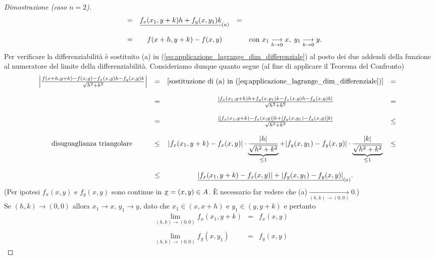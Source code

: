 \begin{proof}[Dimostrazione (caso $n=2$)]
\begin{equation}
\begin{matrix}
			&=& \uline{f_x(x_1,y+k) h + f_y(x,y_1) k}_{(a)} &=&\\\\
			&=& f(x+h,y+k)-f(x,y) && \text{con }x_1\underset{h\rightarrow 0}{\longrightarrow}x,\; y_1\underset{k\rightarrow 0}{\longrightarrow}y.
		\end{matrix}
	\end{equation}
	Per verificare la differenziabilità è sostituito (a) in (\ref{eq:applicazione_lagrange_dim_differenziale}) al posto dei due addendi della funzione al numeratore del limite della differenziabilità.
	Consideriamo dunque quanto segue (al fine di applicare il Teorema del Confronto)
	\begin{equation*}%
		\begin{matrix}
			\left|\frac{f(x+h,y+k) - f(x,y) - f_x(x,y)h - f_y(x,y)k}{\sqrt{h^2+k^2}}\right| &=& [\text{sostituzione di (a) in } (\ref{eq:applicazione_lagrange_dim_differenziale})] &=&\\\\
			&=& \frac{|f_x(x_1,y+k) h + f_y(x,y_1) k - f_x(x,y)h - f_y(x,y)k|}{\sqrt{h^2+k^2}} &=& \\\\
			&=& \frac{|[f_x(x_1,y+k)-f_x(x,y)]h + [f_y(x,y_1) - f_y(x,y)]k|}{\sqrt{h^2+k^2}} &\leq&\\\\
			\text{disuguaglianza triangolare }&\leq& |f_x(x_1,y+k)-f_x(x,y)| \cdot \underbrace{\frac{|h|}{\sqrt{h^2+k^2}}}_{\leq 1} + |f_y(x,y_1) - f_y(x,y)| \cdot \underbrace{\frac{|k|}{\sqrt{h^2 + k^2}}}_{\leq 1} &\leq&\\\\
			&\leq& \uline{|f_x(x_1,y+k)-f_x(x,y)|  + |f_y(x,y_1) - f_y(x,y)|}_{(a)}.
		\end{matrix}
	\end{equation*}
	(Per ipotesi $f_x(x,y)$ e $f_y(x,y)$ sono continue in $\uline x=(x,y)\in A$. È necessario far vedere che (a)$\underset{(h,k)\rightarrow(0,0)}{\longrightarrow}0$.)\\
	Se $(h,k)\rightarrow(0,0)$ allora $x_1\rightarrow x,\, y_1\rightarrow y$, dato che $x_1\in(x,x+h)$ e $y_1\in(y, y+k)$ e pertanto
	\begin{equation*}
		\begin{matrix}
			\lim\limits_{(h,k)\rightarrow(0,0)}f_x(x_1, y+k) &=& f_x(x,y)\\\\
			\lim\limits_{(h,k)\rightarrow(0,0)}f_y(x, y_1) &=& f_y(x,y)
		\end{matrix}

\end{equation*}
\end{proof}
